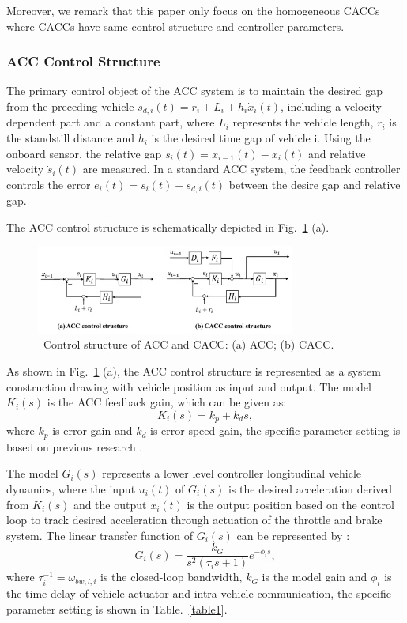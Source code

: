 \documentclass[journal]{IEEEtran}
\begin{document}
Moreover, we remark that this paper only focus on the homogeneous CACCs where CACCs have same control structure and controller parameters.


\subsubsection{ACC Control Structure}
\label{Section 2.3.1}
The primary control object of the ACC system is to maintain the desired gap from the preceding vehicle $s_{d, i}(t)=r_{i}+L_{i}+h_{i} \dot{x}_{i}(t)$, including a velocity-dependent part and a constant part, where $L_i$ represents the vehicle length, $r_i$ is the standstill distance and $h_i$ is the desired time gap of vehicle i. Using the onboard sensor, the relative gap $s_{i}(t)=x_{i-1}(t)-x_{i}(t)$ and relative velocity $\dot{s}_{i} (t)$ are measured. In a standard ACC system, the feedback controller controls the error $e_{i}(t)=s_{i}(t)-s_{d, i}(t)$ between the desire gap and relative gap.

The ACC control structure is schematically depicted in Fig.~\ref{fig2} (a).

\begin{figure}
  \centering
  \includegraphics[width=8.5cm]{figs/fig2.png}
  \caption{~Control structure of ACC and CACC: (a) ACC; (b) CACC.}
  \label{fig2}
\end{figure}

As shown in Fig.~\ref{fig2} (a), the ACC control structure is represented as a system construction drawing with vehicle position as input and output. The model $K_i (s)$ is the ACC feedback gain, which can be given as:
\begin{equation}
  K_{i}(s)=k_{p}+k_{d} s,
\end{equation}
where $k_p$ is error gain and $k_d$ is error speed gain, the specific parameter setting is based on previous research \citep{milanes2014modeling,milanes2013cooperative}.

The model $G_i (s)$ represents a lower level controller longitudinal vehicle dynamics, where the input $u_i (t)$ of $G_i (s)$ is the desired acceleration derived from $K_i (s)$ and the output $x_i (t)$ is the output position based on the control loop to track desired acceleration through actuation of the throttle and brake system. The linear transfer function of $G_i (s)$ can be represented by \citep{ploeg2013lp}:
\begin{equation}
  G_{i}(s)=\frac{k_{G}}{s^{2}\left(\tau_{i} s+1\right)} e^{-\phi_{i} s},
\end{equation}
where $\tau_{i}^{-1}=\omega_{b w, l, i}$ is the closed-loop bandwidth, $k_G$ is the model gain and $\phi_{i}$ is the time delay of vehicle actuator and intra-vehicle
communication, the specific parameter setting is shown in Table.~\ref{table1}.
\end{document}
